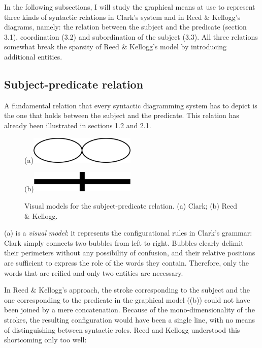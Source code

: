 \documentclass[output=paper]{langsci/langscibook}
\begin{document}
In the following subsections, I will study the graphical means at use to represent three kinds of syntactic relations in Clark’s system and in Reed \& Kellogg’s diagrams, namely: the relation between the subject and the predicate (section 3.1), coordination (3.2) and subordination of the subject (3.3). All three relations somewhat break the sparsity of Reed \& Kellogg’s model by introducing additional entities.

\subsection{Subject-predicate relation}

A fundamental relation that every syntactic diagramming system has to depict is the one that holds between the subject and the predicate. This relation has already been illustrated in sections 1.2 and 2.1.

\begin{figure}
   
    \centering
    (a)\includegraphics[width=0.45\textwidth]{figures/04/Kap.4.img.0005a.png}
    
    (b)\includegraphics[width=0.45\textwidth]{figures/04/Kap.4.img.0005b.png}
    
    \caption{Visual models for the subject-predicate relation. (a) Clark; (b) Reed \& Kellogg.}
    \label{fig:5}
    
\end{figure}


(a) is a \textit{visual} \textit{model}: it represents the configurational rules in Clark’s grammar: Clark simply connects two bubbles from left to right. Bubbles clearly delimit their perimeters without any possibility of confusion, and their relative positions are sufficient to express the role of the words they contain. Therefore, only the words that are reified and only two entities are necessary.

In Reed \& Kellogg’s approach, the stroke corresponding to the subject and the one corresponding to the predicate in the graphical model ((b)) could not have been joined by a mere concatenation. Because of the mono-dimensionality of the strokes, the resulting configuration would have been a single line, with no means of distinguishing between syntactic roles. Reed and Kellogg understood this shortcoming only too well:
\end{document}
